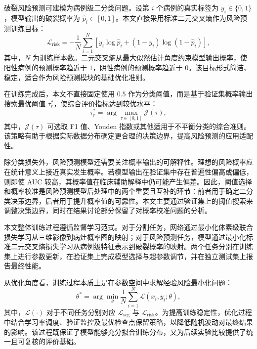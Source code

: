 破裂风险预测可建模为病例级二分类问题。设第 $i$ 个病例的真实标签为 $y_i\in\{0,1\}$，模型输出的破裂概率为 $\hat{p}_i\in[0,1]$。本文直接采用标准二元交叉熵作为风险预测训练目标：
\begin{equation}
\mathcal{L}_{\mathrm{risk}} = -\frac{1}{N}\sum_{i=1}^{N}\left[y_i\log \hat{p}_i + (1-y_i)\log(1-\hat{p}_i)\right],
\end{equation}
其中，$N$ 为训练样本数。二元交叉熵从最大似然估计角度约束模型输出概率，使阳性病例的预测概率趋近于 $1$，阴性病例的预测概率趋近于 $0$。该目标形式简洁、稳定，适合作为风险预测模块的基础优化准则。

在训练完成后，本文不直接固定使用 $0.5$ 作为分类阈值，而是基于验证集概率输出搜索最优阈值 $\tau_r^{\ast}$，使综合评价指标达到较优水平：
\begin{equation}
\tau_r^{\ast}=\arg\max_{\tau\in[0,1]}\mathcal{J}(\tau),
\end{equation}
其中，$\mathcal{J}(\tau)$ 可选取 F1 值、Youden 指数或其他适用于不平衡分类的综合准则。该策略有助于根据实际数据分布确定更合理的决策边界，提高风险预测的应用适配性。

除分类损失外，风险预测模型还需要关注概率输出的可解释性。理想的风险概率应在统计意义上接近真实发生概率。若模型输出在验证集中存在普遍性偏高或偏低，则即使 AUC 较高，其概率值在临床辅助解释中仍可能产生偏差。因此，阈值选择和概率校准是风险预测模型后处理中的两个重要且互补的环节：前者用于确定二分类决策边界，后者用于提升概率值的可靠性。本文主要通过验证集上的阈值搜索来调整决策边界，同时在结果讨论部分保留了对概率校准问题的分析。


本文整体训练过程遵循监督学习范式。对于分割任务，网络通过最小化体素级联合损失学习从三维影像到病灶概率图的映射；对于风险预测任务，模型通过最小化标准二元交叉熵损失学习从病例级特征表示到破裂概率的映射。两个任务分别在训练集上进行参数更新，在验证集上完成模型选择与超参数调节，并在独立测试集上报告最终性能。

从优化角度看，训练过程本质上是在参数空间中求解经验风险最小化问题：
\begin{equation}
\theta^{\ast}=\arg\min_{\theta}\frac{1}{N}\sum_{i=1}^{N}\mathcal{L}(x_i,y_i;\theta),
\end{equation}
其中，$\mathcal{L}(\cdot)$ 对于不同任务分别对应 $\mathcal{L}_{\mathrm{seg}}$ 与 $\mathcal{L}_{\mathrm{risk}}$。为提高训练稳定性，优化过程中结合学习率调度、验证监控及最优检查点保留策略，以降低随机波动对最终结果的影响。该过程既保证了模型能够充分拟合训练分布，又为后续实验比较提供了统一且可复核的评价基础。

